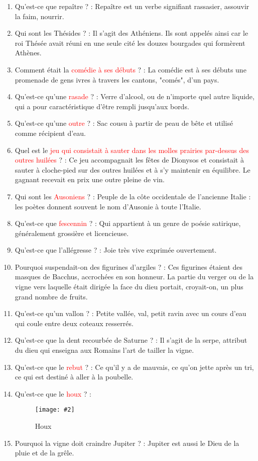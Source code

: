 \documentclass[a4paper, 11pt, hidelinks]{article}
\newcommand{\img}[4]{\begin{figure}[!ht]
    \centering
    \texttt{[image: \#2]}
    \caption{#3}
    \label{#4}
    \end{figure} }
\begin{document}
\begin{enumerate}
      \item Qu'est-ce que repaître ? : Repaître est un verbe signifiant rassasier, assouvir la faim, nourrir.
      \item Qui sont les Thésides ? : Il s'agit des Athéniens. Ils sont appelés ainsi car le roi Thésée avait réuni en une seule cité
            les douzes bourgades qui formèrent Athènes.
      \item Comment était la \textcolor{red}{comédie à ses débuts} ? : La comédie est à ses débuts une promenade de gens ivres à travers les cantons, "comés", d'un pays.
      \item Qu'est-ce qu'une \textcolor{red}{rasade} ? : Verre d'alcool, ou de n'importe quel autre liquide, qui a pour caractéristique d'être rempli jusqu'aux bords.
      \item Qu'est-ce qu'une \textcolor{red}{outre} ? : Sac cousu à partir de peau de bête et utilisé comme récipient d'eau.
      \item Quel est le \textcolor{red}{jeu qui consistait à sauter dans les molles prairies par-dessus des outres huilées} ? : Ce jeu accompagnait les fêtes de
            Dionysos et consistait à sauter à cloche-pied sur des outres huilées et à s'y maintenir en équilibre. Le gagnant recevait en prix une outre pleine de vin.
      \item Qui sont les \textcolor{red}{Ausoniens} ? : Peuple de la côte occidentale de l'ancienne Italie : les poètes donnent souvent le nom
            d'Ausonie à toute l'Italie.
      \item Qu'est-ce que \textcolor{red}{fescennin} ? : Qui appartient à un genre de poésie satirique, généralement grossière et licencieuse.
      \item Qu'est-ce que l'allégresse ? : Joie très vive exprimée ouvertement.
      \item Pourquoi suspendait-on des figurines d'argiles ? : Ces figurines étaient des masques de Bacchus, accrochées en son
            honneur. La partie du verger ou de la vigne vers laquelle était dirigée la face du dieu portait, croyait-on, un plus grand
            nombre de fruits.
      \item Qu'est-ce qu'un vallon ? : Petite vallée, val, petit ravin avec un cours d'eau qui coule entre deux coteaux resserrés.
      \item Qu'est-ce que la dent recourbée de Saturne ? : Il s'agit de la serpe, attribut du dieu qui enseigna aux Romains l'art
            de tailler la vigne.
      \item Qu'est-ce que le \textcolor{red}{rebut} ? : Ce qu'il y a de mauvais, ce qu'on jette après un tri, ce qui est destiné à aller à la poubelle.
      \item Qu'est-ce que le \textcolor{red}{houx} ? :
            \img{0.5}{Houx.jpg}{Houx}{94}
      \item Pourquoi la vigne doit craindre Jupiter ? : Jupiter est aussi le Dieu de la pluie et de la grêle.
\end{enumerate}
\end{document}
